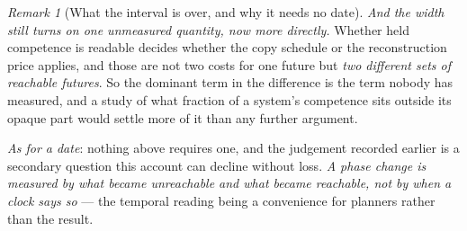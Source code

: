 \documentclass[11pt,a4paper]{article}
\theoremstyle{remark}
\newtheorem{remark}[definition]{Remark}
\begin{document}
\begin{remark}[What the interval is over, and why it needs no date]
\emph{And the width still turns on one unmeasured quantity, now more directly.} Whether held competence
is readable decides whether the copy schedule or the reconstruction price applies, and those are not two
costs for one future but \emph{two different sets of reachable futures}. So the dominant term in the
difference is the term nobody has measured, and a study of what fraction of a system's competence sits
outside its opaque part would settle more of it than any further argument.

\emph{As for a date}: nothing above requires one, and the judgement recorded earlier is a secondary
question this account can decline without loss. \emph{A phase change is measured by what became
unreachable and what became reachable, not by when a clock says so} --- the temporal reading being a
convenience for planners rather than the result.
\end{remark}
\end{document}
